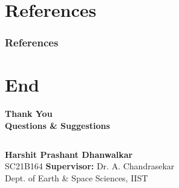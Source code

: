 \documentclass[aspectratio=169,t,xcolor=table]{beamer}
\begin{document}
\section{References}
\begin{frame}[allowframebreaks]
    \frametitle{References}
    \nocite{*}
    
    \tiny
    
\end{frame}

\section{End}
\begin{frame}
  \centering
  \vspace{3.0cm}
  \textbf{\Huge Thank You} \\
  \vspace{0.8cm}
  \textbf{\large Questions \& Suggestions}
  \vspace{1.5cm}

  \footnotesize
  \begin{columns}
    \centering
    \textbf{Harshit Prashant Dhanwalkar} \\
    SC21B164
    \centering
    \textbf{Supervisor:} Dr. A. Chandrasekar \\
    Dept. of Earth \& Space Sciences, IIST
  \end{columns}
\end{frame}
\end{document}
